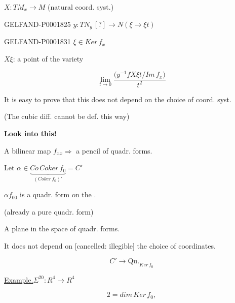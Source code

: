 $X: TM_x\longrightarrow M$ (natural coord. syst.)

\begin{GelfandAdjacentEvidence}{GELFAND-P000182}{5}
$y: TN_y\, [?]\longrightarrow N$\qquad $(\xi\longrightarrow\xi t)$
\end{GelfandAdjacentEvidence}



\begin{GelfandAdjacentEvidence}{GELFAND-P000183}{1}
$\xi\in Ker\, f_x$

$X\xi$: a point of the variety

\begin{equation*}\lim_{t\to0}\frac{\bigl (y^{-1}fX\xi t/Im\, f_x\bigr)}{t^2}\end{equation*}

It is easy to prove that this does not depend on the choice of coord. syst.

(The cubic diff. cannot be def. this way)

\textbf{Look into this!}

A bilinear map $f_{xx}\Longrightarrow$ a pencil of quadr. forms.

Let $\alpha\in\underbrace{Co\, Coker\, f_0}_{(Coker\, f_0)'}=C'$

$\alpha f_{00}$ is a quadr. form on the .

(already a pure quadr. form)

A plane in the space of quadr. forms.

It does not depend on [cancelled: illegible] the choice of coordinates.
\end{GelfandAdjacentEvidence}

\begin{equation*}C'\longrightarrow\text{Qu.}_{Ker\, f_0}\end{equation*}

\underline{Example.}\qquad $\Sigma^{20}: R^4\longrightarrow R^4$

\begin{equation*}2=dim\, Ker\, f_0,\end{equation*}

